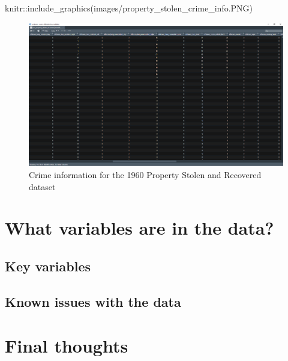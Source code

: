 \documentclass[
  12pt,
  openany]{book}
\newenvironment{Shaded}{\begin{snugshade}}{\end{snugshade}}
\newcommand{\FunctionTok}[1]{\textcolor[rgb]{0,0,0}{#1}}
\newcommand{\NormalTok}[1]{#1}
\newcommand{\SpecialCharTok}[1]{\textcolor[rgb]{0,0,0}{#1}}
\newcommand{\StringTok}[1]{\textcolor[rgb]{0.5,0.5,0.5}{#1}}
\begin{document}
\begin{Shaded}
\begin{Highlighting}[]
\NormalTok{knitr}\SpecialCharTok{::}\FunctionTok{include\_graphics}\NormalTok{(}\StringTok{\textquotesingle{}images/property\_stolen\_crime\_info.PNG\textquotesingle{}}\NormalTok{)}
\end{Highlighting}
\end{Shaded}

\begin{figure}
\includegraphics[width=26.61in]{images/property_stolen_crime_info} \caption{Crime information for the 1960 Property Stolen and Recovered dataset}\label{fig:unnamed-chunk-3}
\end{figure}

\hypertarget{what-variables-are-in-the-data-5}{%
\section{What variables are in the data?}\label{what-variables-are-in-the-data-5}}

\hypertarget{key-variables-5}{%
\subsection{Key variables}\label{key-variables-5}}

\hypertarget{known-issues-with-the-data-5}{%
\subsection{Known issues with the data}\label{known-issues-with-the-data-5}}

\hypertarget{final-thoughts-5}{%
\section{Final thoughts}\label{final-thoughts-5}}
\end{document}
